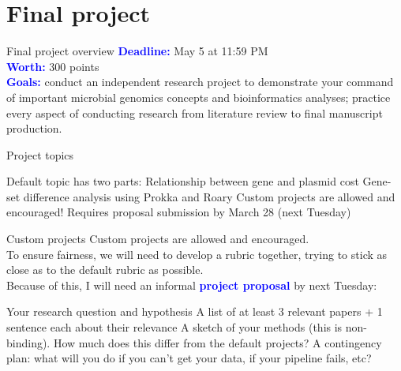 \documentclass{beamer}
\newcommand{\blu}[1]{\textcolor{blue}{\textbf{#1}}}
\begin{document}
\section{Final project}

\begin{frame}{Final project overview}
    \blu{Deadline:} May 5 at 11:59 PM\\
    \bigskip
    \blu{Worth:} 300 points\\
    \bigskip
    \blu{Goals:} conduct an independent research project to demonstrate your command of important microbial genomics concepts and bioinformatics analyses; practice every aspect of conducting research from literature review to final manuscript production.
\end{frame}

\begin{frame}{Project topics}
    \begin{outline}
        \1 Default topic has two parts:
            \2 Relationship between gene and plasmid cost
            \2 Gene-set difference analysis using Prokka and Roary
        \1 Custom projects are allowed and encouraged!
            \2 Requires proposal submission by March 28 (next Tuesday)
    \end{outline}
\end{frame}


\begin{frame}{Custom projects}
    Custom projects are allowed and encouraged.\\
    \bigskip
    To ensure fairness, we will need to develop a rubric together, trying to stick as close as to the default rubric as possible.\\
    \bigskip
    Because of this, I will need an informal \blu{project proposal} by next Tuesday:
    \begin{outline}
        \1 Your research question and hypothesis
        \1 A list of at least 3 relevant papers + 1 sentence each about their relevance
        \1 A sketch of your methods (this is non-binding). How much does this differ from the default projects?
        \1 A contingency plan: what will you do if you can't get your data, if your pipeline fails, etc?
    \end{outline}
\end{frame}
\end{document}
